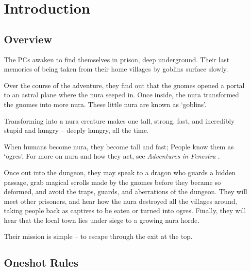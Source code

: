 \chapter{Introduction}

\section{Overview}

\begin{multicols}{2}

\noindent
The PCs awaken to find themselves in prison, deep underground.
Their last memories of being taken from their home villages by goblins surface slowly.

Over the course of the adventure, they find out that the gnomes opened a portal to an astral plane where the nura seeped in.
Once inside, the nura transformed the gnomes into more nura.
These little nura are known as `goblins'.

Transforming into a nura creature makes one tall, strong, fast, and incredibly stupid and hungry -- deeply hungry, all the time.

When humans become nura, they become tall and fast;
People know them as `ogres'.
For more on nura and how they act, see \textit{Adventures in Fenestra}%
\iftoggle{aif}{%
	, chapter \ref{nura}}{}%
.

Once out into the dungeon, they may speak to a dragon who guards a hidden passage, grab magical scrolls made by the gnomes before they became so deformed, and avoid the traps, guards, and aberrations of the dungeon.
They will meet other prisoners, and hear how the nura destroyed all the villages around, taking people back as captives to be eaten or turned into ogres.
Finally, they will hear that the local town lies under siege to a growing nura horde.

Their mission is simple -- to escape through the exit at the top.

\end{multicols}

\section{Oneshot Rules}

